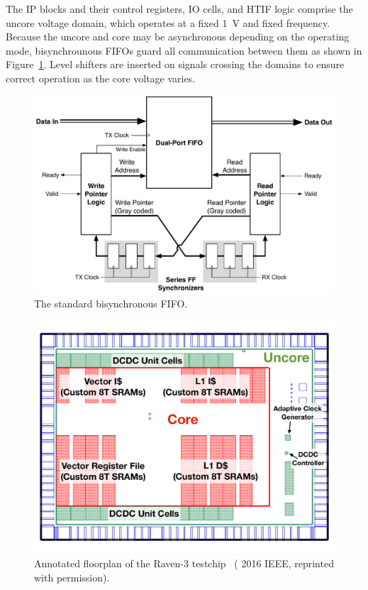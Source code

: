 \documentclass[graybox]{svmult}
\begin{document}
The IP blocks and their control registers, IO cells, and HTIF logic comprise the uncore voltage domain, which operates at a fixed \SI{1}{\volt} and fixed frequency.
Because the uncore and core may be asynchronous depending on the operating mode, bisynchrounous FIFOs guard all communication between them as shown in Figure~\ref{fig:5-bisync-fifo}.
Level shifters are inserted on signals crossing the domains to ensure correct operation as the core voltage varies.

\begin{figure}
  \centering
  \includegraphics[width=\textwidth]{5-bisync-fifo}
  \caption{The standard bisynchronous FIFO.}
  \label{fig:5-bisync-fifo}
\end{figure}

\begin{figure}
  \centering
  \includegraphics[width=\textwidth]{6-raven3-floorplan}
  \caption{Annotated floorplan of the Raven-3 testchip~\cite{Zimmer2016} ({\textcopyright} 2016 IEEE, reprinted with permission).}
  \label{fig:6-raven3-floorplan}
\end{figure}
\end{document}
